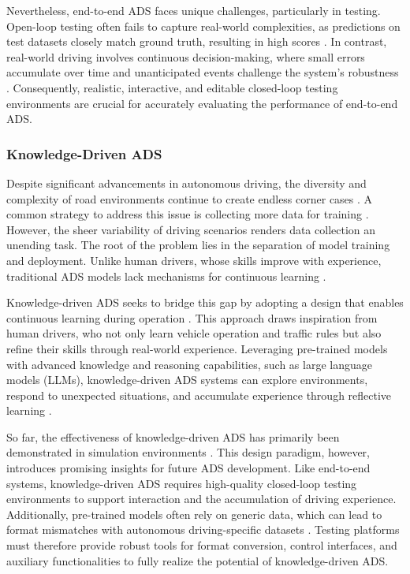 Nevertheless, end-to-end ADS faces unique challenges, particularly in testing. Open-loop testing often fails to capture real-world complexities, as predictions on test datasets closely match ground truth, resulting in high scores \citep{caesar2021nuplan,jia2024bench2drive}. In contrast, real-world driving involves continuous decision-making, where small errors accumulate over time and unanticipated events challenge the system's robustness \citep{zhang2022rethinking,chen2024end}. Consequently, realistic, interactive, and editable closed-loop testing environments are crucial for accurately evaluating the performance of end-to-end ADS.

\subsubsection{Knowledge-Driven ADS}



Despite significant advancements in autonomous driving, the diversity and complexity of road environments continue to create endless corner cases \citep{bolte2019towards}. A common strategy to address this issue is collecting more data for training \citep{li2022coda}. However, the sheer variability of driving scenarios renders data collection an unending task. The root of the problem lies in the separation of model training and deployment. Unlike human drivers, whose skills improve with experience, traditional ADS models lack mechanisms for continuous learning \citep{lan2022instance,wen2023dilu}.

Knowledge-driven ADS seeks to bridge this gap by adopting a design that enables continuous learning during operation \citep{mao2023gpt,li2023towards,xu2024drivegpt4,tang2024grounded}. This approach draws inspiration from human drivers, who not only learn vehicle operation and traffic rules but also refine their skills through real-world experience. Leveraging pre-trained models with advanced knowledge and reasoning capabilities, such as large language models (LLMs), knowledge-driven ADS systems can explore environments, respond to unexpected situations, and accumulate experience through reflective learning \citep{sha2023languagempc,cui2023drivellm,wen2023dilu,mei2024continuously}.

So far, the effectiveness of knowledge-driven ADS has primarily been demonstrated in simulation environments \citep{jin2023surrealdriver,chen2024driving,cui2024drive}. This design paradigm, however, introduces promising insights for future ADS development. Like end-to-end systems, knowledge-driven ADS requires high-quality closed-loop testing environments to support interaction and the accumulation of driving experience. Additionally, pre-trained models often rely on generic data, which can lead to format mismatches with autonomous driving-specific datasets \citep{cui2024survey}. Testing platforms must therefore provide robust tools for format conversion, control interfaces, and auxiliary functionalities to fully realize the potential of knowledge-driven ADS.

